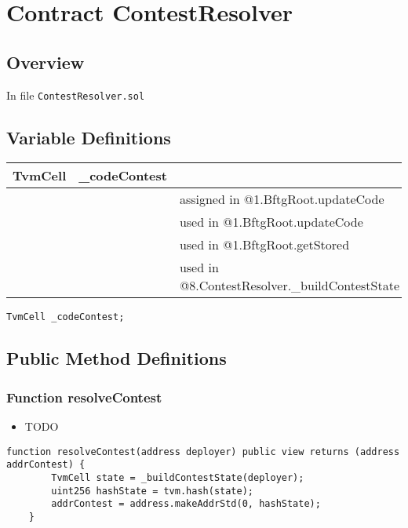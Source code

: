 
\chapter{Contract ContestResolver}

\minitoc

\section{Overview}


In file {\tt ContestResolver.sol}

\section{Variable Definitions}


\ifsoltables
\noindent\begin{tabular}{|l|l|p{5cm}|}\hline
TvmCell & \_{}codeContest &  \\\hline
 & & assigned in @1.BftgRoot.updateCode\\\hline
 & & used in @1.BftgRoot.updateCode\\\hline
 & & used in @1.BftgRoot.getStored\\\hline
 & & used in @8.ContestResolver.\_{}buildContestState\\\hline
\end{tabular}
\fi


\begin{lstlisting}[firstnumber=8]
    TvmCell _codeContest;
\end{lstlisting}

\section{Public Method Definitions}


\subsection{Function resolveContest}

\begin{itemize}
\item TODO
\end{itemize}

\begin{lstlisting}[firstnumber=10]
    function resolveContest(address deployer) public view returns (address addrContest) {
        TvmCell state = _buildContestState(deployer);
        uint256 hashState = tvm.hash(state);
        addrContest = address.makeAddrStd(0, hashState);
    }
\end{lstlisting}

